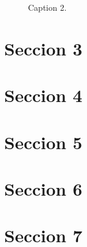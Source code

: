 \documentclass[
  letterpaper,
  twocolumn,
  9pt,
  journal,
  final]{IEEEtran}
\begin{document}
\begin{figure}[tbh!]
  \begin{center}
  \end{center}
  \caption{Caption 2.} \label{fig:texto referenecia2}
\end{figure}

\lipsum[1]

\section{Seccion 3}


\lipsum[1]

\section{Seccion 4}
\lipsum[1]

\section{Seccion 5}
\lipsum[1]

\section{Seccion 6}
\lipsum[1]

\section{Seccion 7}
\lipsum[1]


\nocite{*}


\end{document}
